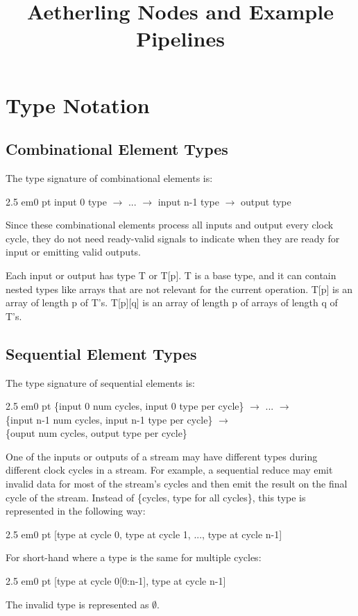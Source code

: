 \documentclass[11pt,fleqn]{article}
\numberwithin{equation}{subsection}
\begin{document}
\title{Aetherling Nodes and Example Pipelines}

\section{Type Notation}

\subsection{Combinational Element Types}
The type signature of combinational elements is:
\begin{adjustwidth}{2.5 em}{0 pt}
    input 0 type $\rightarrow$ ... $\rightarrow$ input n-1 type $\rightarrow$ output type
\end{adjustwidth}
Since these combinational elements process all inputs and output every 
clock cycle, they do not need ready-valid signals to indicate when they are
ready for input or emitting valid outputs.

Each input or output has type T or T[p]. T is a base type, and it can contain 
nested types like arrays that are not relevant for the current operation. T[p] 
is an array of length p of T's. T[p][q] is an array of length p of arrays of 
length q of T's.

\subsection{Sequential Element Types}
The type signature of sequential elements is:
\begin{adjustwidth}{2.5 em}{0 pt}
    \{input 0 num cycles, input 0 type per cycle\} $\rightarrow$ ...
    $\rightarrow$ \\
    \{input n-1 num cycles, input n-1 type per cycle\} $\rightarrow$ \\ 
    \{ouput num cycles, output type per cycle\}
\end{adjustwidth}

One of the inputs or outputs of a stream may have different types during different
clock cycles in a stream. For example, a sequential reduce may emit invalid 
data for most of the stream's cycles and then emit the result on the final
cycle of the stream. Instead of \{cycles, type for all cycles\}, 
this type is represented in the following way:
\begin{adjustwidth}{2.5 em}{0 pt}
    [type at cycle 0, type at cycle 1, ..., type at cycle n-1]
\end{adjustwidth}
For short-hand where a type is the same for multiple cycles:
\begin{adjustwidth}{2.5 em}{0 pt}
    [type at cycle 0[0:n-1], type at cycle n-1]
\end{adjustwidth}
The invalid type is represented as $\emptyset$.
\end{document}
